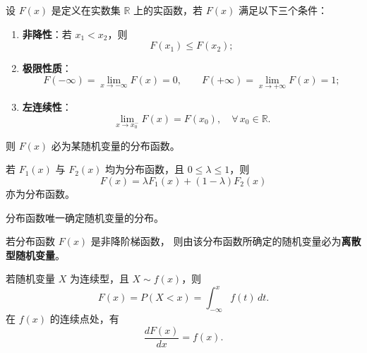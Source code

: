 \begin{theorem}[判定分布函数的方法]
设 $F(x)$ 是定义在实数集 $\mathbb{R}$ 上的实函数，若 $F(x)$ 满足以下三个条件：

\begin{enumerate}[(1)]
  \item \textbf{非降性}：若 $x_1 < x_2$，则
  \[
  F(x_1) \le F(x_2);
  \]
  
  \item \textbf{极限性质}：
  \[
  F(-\infty) = \lim_{x \to -\infty} F(x) = 0, 
  \qquad
  F(+\infty) = \lim_{x \to +\infty} F(x) = 1;
  \]
  
  \item \textbf{左连续性}：
  \[
  \lim_{x \to x_0^-} F(x) = F(x_0), \quad \forall\, x_0 \in \mathbb{R}.
  \]
\end{enumerate}

则 $F(x)$ 必为某随机变量的分布函数。
\end{theorem}
\begin{proposition}[分布函数的凸组合性质]
若 $F_1(x)$ 与 $F_2(x)$ 均为分布函数，且 \(0 \le \lambda \le 1\)，则
\[
F(x) = \lambda F_1(x) + (1-\lambda) F_2(x)
\]
亦为分布函数。
\end{proposition}
\begin{proposition}[分布函数与随机变量的对应关系]
分布函数唯一确定随机变量的分布。

若分布函数 \( F(x) \) 是非降阶梯函数，
则由该分布函数所确定的随机变量必为\textbf{离散型随机变量}。
\end{proposition}
\begin{proposition}[分布函数与密度函数的关系]
若随机变量 \( X \) 为连续型，且 \( X \sim f(x) \)，则
\[
F(x) = P(X < x) = \int_{-\infty}^{x} f(t)\,dt.
\]
在 \( f(x) \) 的连续点处，有
\[
\frac{dF(x)}{dx} = f(x).
\]
\end{proposition}

